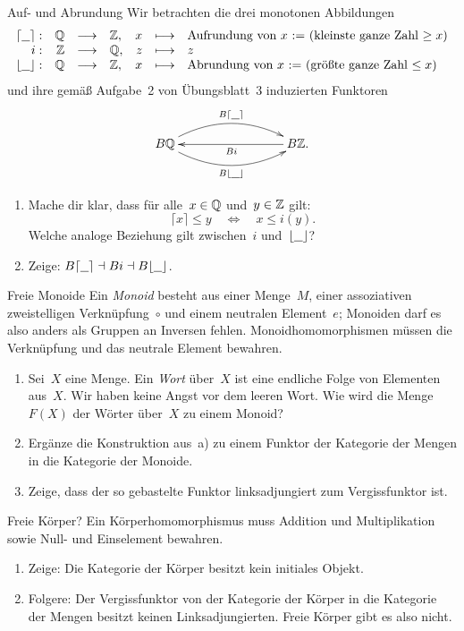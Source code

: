 \documentclass{pizzablatt}
\begin{document}

\begin{aufgabe}{Auf- und Abrundung}
Wir betrachten die drei monotonen Abbildungen
\[ \begin{array}{@{}rrclrcl@{}}
  \lceil\freist\rceil: & \QQ &\longrightarrow& \ZZ, &
  x &\longmapsto& \text{Aufrundung von~$x$ := (kleinste ganze Zahl~$\geq x$)} \\
  i: & \ZZ &\longrightarrow& \QQ, &
  z &\longmapsto& z \\
  \lfloor\freist\rfloor: & \QQ &\longrightarrow& \ZZ, &
  x &\longmapsto& \text{Abrundung von~$x$ := (größte ganze Zahl~$\leq x$)}
\end{array} \]
und ihre gemäß Aufgabe~2 von Übungsblatt~3 induzierten Funktoren
\[ \xymatrixcolsep{7pc}\xymatrix{
  B\QQ
    \ar@/^1.4pc/[r]^{B\lceil\freist\rceil}
    \ar@/_1.4pc/[r]_{B\lfloor\freist\rfloor}
  & B\ZZ. \ar[l]^{Bi}
} \]
\begin{enumerate}
\item Mache dir klar, dass für alle~$x \in \mathbb{Q}$ und~$y \in \mathbb{Z}$ gilt:
\[ \lceil x \rceil \leq y \quad\Longleftrightarrow\quad
  x \leq i(y). \]
Welche analoge Beziehung gilt zwischen~$i$ und~$\lfloor\underline{\ \ }\rfloor$?
\item Zeige: $B\lceil\underline{\ \ }\rceil \dashv Bi \dashv B\lfloor\underline{\ \ }\rfloor$.
\end{enumerate}
\end{aufgabe}

\begin{aufgabe}{Freie Monoide}
Ein \emph{Monoid} besteht aus einer Menge~$M$, einer assoziativen
zweistelligen Verknüpfung~$\circ$ und einem neutralen Element~$e$; Monoiden
darf es also anders als Gruppen an Inversen fehlen. Monoidhomomorphismen müssen
die Verknüpfung und das neutrale Element bewahren.
\begin{enumerate}
\item
Sei~$X$ eine Menge. Ein \emph{Wort} über~$X$ ist eine endliche Folge von
Elementen aus~$X$. Wir haben keine Angst vor dem leeren Wort. Wie wird die
Menge~$F(X)$ der Wörter über~$X$ zu einem Monoid?
\item Ergänze die Konstruktion aus~a) zu einem Funktor der Kategorie der
Mengen in die Kategorie der Monoide.
\item Zeige, dass der so gebastelte Funktor linksadjungiert zum Vergissfunktor
ist.
\end{enumerate}
\end{aufgabe}

\begin{aufgabe}{Freie Körper?}
Ein Körperhomomorphismus muss Addition und Multiplikation sowie Null- und
Einselement bewahren.
\begin{enumerate}
\item Zeige: Die Kategorie der Körper besitzt kein initiales Objekt.
\item Folgere: Der Vergissfunktor von der Kategorie der Körper in die Kategorie
der Mengen besitzt keinen Linksadjungierten. Freie Körper gibt es also nicht.
\end{enumerate}
\end{aufgabe}
\end{document}
